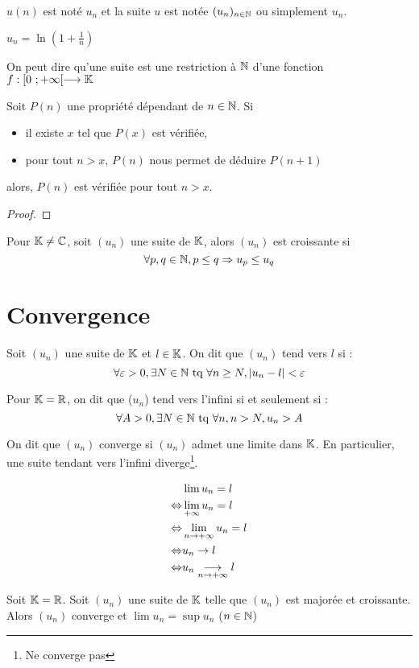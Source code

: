 \nota
$u(n)$ est noté $u_n$ et la suite $u$ est notée $(u_n)_{n\in \mathbb{N}}$ ou simplement $u_n$.

\expl
$u_n = \ln\left(1+\frac{1}{n}\right)$

\rem
On peut dire qu'une suite est une restriction à $\mathbb{N}$ d'une fonction $f:[0~;+\infty[\longrightarrow\mathbb{K}$

\axiome[Récurrence]
Soit $P(n)$ une propriété dépendant de $n\in \mathbb{N}$. Si
\begin{itemize}
	\item il existe $x$ tel que $P(x)$ est vérifiée,
	\item pour tout $n>x$, $P(n)$ nous permet de déduire $P(n+1)$
\end{itemize}
alors, $P(n)$ est vérifiée pour tout $n>x$.

\prop{}

\begin{proof}\end{proof}

Pour $\mathbb{K} \neq\mathbb{C}$, soit $(u_n)$ une suite de $\mathbb{K}$, alors $(u_n)$ est croissante si 
$$\forall p,q \in \mathbb{N}, p \leq q \Rightarrow u_p \leq u_q$$

\section{Convergence}
Soit $(u_n)$ une suite de $\mathbb{K}$ et $l\in\mathbb{K}$. On dit que $(u_n)$ tend vers $l$ si :
$$\forall\varepsilon>0,\exists N\in\mathbb{N}\text{~tq~}\forall n\geq N, |u_n-l| < \varepsilon$$

Pour $\mathbb{K}=\mathbb{R}$, on dit que ($u_n$) tend vers l'infini si et seulement si :
$$\forall A>0,\exists N\in\mathbb{N}\text{~tq~}\forall n,n>N, u_n>A$$

On dit que $(u_n)$ converge si $(u_n)$ admet une limite dans $\mathbb{K}$. En particulier, une suite tendant vers l'infini diverge\footnote{Ne converge pas}.

\nota
\begin{align*}
  &\lim u_n = l\\
\Leftrightarrow& \lim\limits_{+\infty}u_n=l\\
\Leftrightarrow& \lim\limits_{n\to+\infty}u_n = l\\
\Leftrightarrow& u_n \rightarrow l\\
\Leftrightarrow& u_n \underset{n\to+\infty}{\longrightarrow}l
\end{align*}

\thm
Soit $\mathbb{K}=\mathbb{R}$. Soit $(u_n)$ une suite de $\mathbb{K}$ telle que $(u_n)$ est majorée et croissante. Alors $(u_n)$ converge et $\lim u_n = \sup u_n$ ($n\in\mathbb{N}$)

